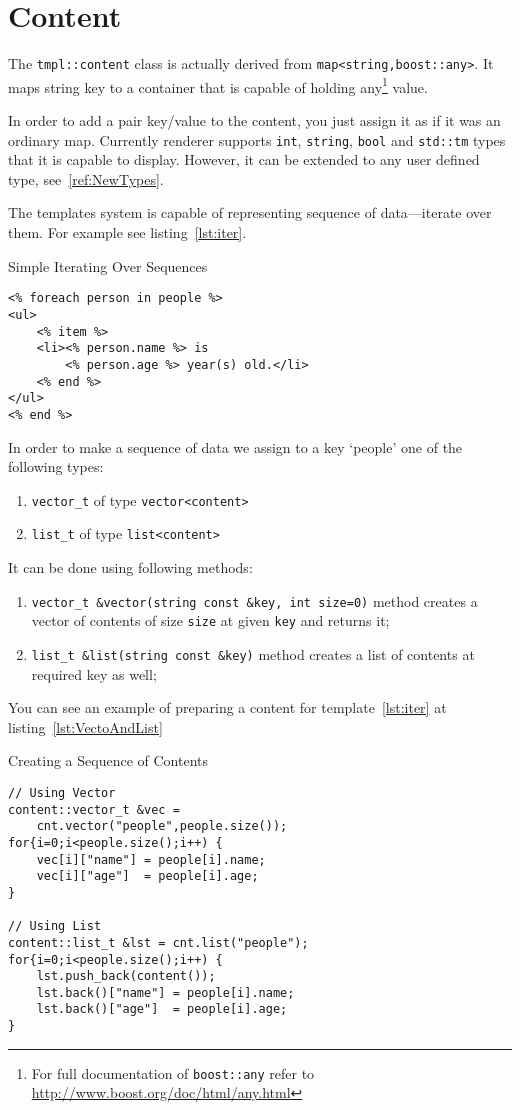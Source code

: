 \documentclass{article}
\newcommand{\tw}[1]{\texttt{#1}}
\begin{document}
\section{Content}

The \verb+tmpl::content+ class is actually derived from \verb+map<string,boost::any>+. It maps 
string key to a container that is capable of holding any\footnote{For full documentation 
of \tw{boost::any} refer to \url{http://www.boost.org/doc/html/any.html} } value.

In order to add a pair key/value to the content, you just assign it as if it was an ordinary map. 
Currently renderer supports \tw{int}, \tw{string}, \tw{bool} and \tw{std::tm} types that it is capable to display.
However, it can be extended to any user defined type, see~\ref{ref:NewTypes}.

The templates system is capable of representing sequence of data---iterate over them. For example see listing~\ref{lst:iter}.

\begin{program}
\caption{Simple Iterating Over Sequences\label{lst:iter}}
\begin{verbatim}
<% foreach person in people %>
<ul>
    <% item %>
    <li><% person.name %> is 
        <% person.age %> year(s) old.</li>
    <% end %> 
</ul>
<% end %>
\end{verbatim}
\end{program}

In order to make a sequence of data we assign to a key `people' one of the following types:
\begin{enumerate}
\item \verb+vector_t+ of type \verb+vector<content>+
\item \verb+list_t+ of type \verb+list<content>+
\end{enumerate}
It can be done using following methods:
\begin{enumerate}
\item \verb+vector_t &vector(string const &key, int size=0)+ 
 method creates a vector of contents of size \tw{size} at given \tw{key} and returns it;
\item \verb+list_t &list(string const &key)+ 
 method creates a list of contents at required key as well;
\end{enumerate}

You can see an example of preparing a content for template~\ref{lst:iter} at listing~\ref{lst:VectoAndList}
\begin{program}
\caption{Creating a Sequence of Contents\label{lst:VectoAndList}}
\begin{verbatim}
// Using Vector
content::vector_t &vec = 
    cnt.vector("people",people.size());
for{i=0;i<people.size();i++) {
    vec[i]["name"] = people[i].name;
    vec[i]["age"]  = people[i].age;
}

// Using List
content::list_t &lst = cnt.list("people");
for{i=0;i<people.size();i++) {
    lst.push_back(content());
    lst.back()["name"] = people[i].name;
    lst.back()["age"]  = people[i].age;
}\end{verbatim}
\end{program}
\end{document}
